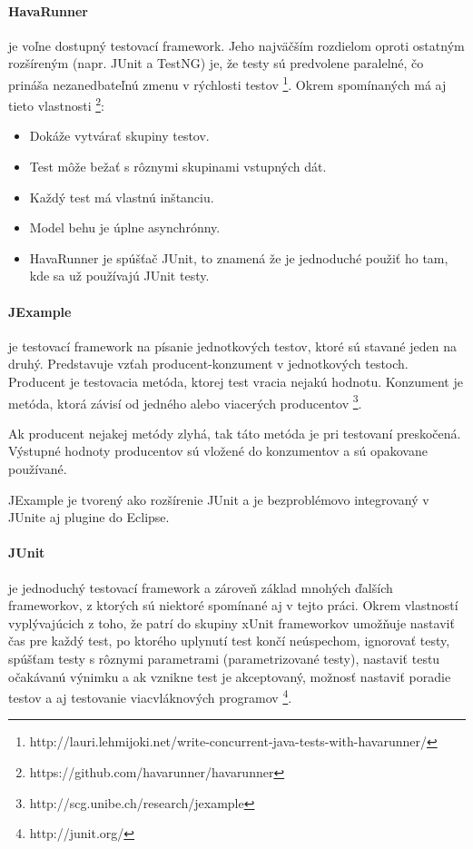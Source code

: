 \documentclass[11pt,twoside,slovak,a4paper]{article}
\begin{document}
		\paragraph{HavaRunner} je voľne dostupný testovací framework. Jeho najväčším rozdielom oproti ostatným rozšíreným (napr. JUnit a TestNG) je, že testy sú predvolene paralelné, čo prináša nezanedbateľnú zmenu v rýchlosti testov \footnote{http://lauri.lehmijoki.net/write-concurrent-java-tests-with-havarunner/}.
		Okrem spomínaných má aj tieto vlastnosti \footnote{https://github.com/havarunner/havarunner}:
		\begin{itemize}
			\item Dokáže vytvárať skupiny testov.
			\item Test môže bežať s rôznymi skupinami vstupných dát.
			\item Každý test má vlastnú inštanciu.
			\item Model behu je úplne asynchrónny.
			\item HavaRunner je spúšťač JUnit, to znamená že je jednoduché použiť ho tam, kde sa už používajú JUnit testy.
		\end{itemize}
		
		\paragraph{JExample} je testovací framework na písanie jednotkových testov, ktoré sú stavané jeden na druhý. Predstavuje vzťah producent-konzument v jednotkových testoch. Producent je testovacia metóda, ktorej test vracia nejakú hodnotu. Konzument je metóda, ktorá závisí od jedného alebo viacerých producentov \footnote{http://scg.unibe.ch/research/jexample}.
		
		Ak producent nejakej metódy zlyhá, tak táto metóda je pri testovaní preskočená. Výstupné hodnoty producentov sú vložené do konzumentov a sú opakovane používané.
		
		JExample je tvorený ako rozšírenie JUnit a je bezproblémovo integrovaný v JUnite aj plugine do Eclipse.
		
		\paragraph{JUnit} je jednoduchý testovací framework a zároveň základ mnohých ďalších frameworkov, z ktorých sú niektoré spomínané aj v tejto práci. Okrem vlastností vyplývajúcich z toho, že patrí do skupiny xUnit frameworkov umožňuje nastaviť čas pre každý test, po ktorého uplynutí test končí neúspechom, ignorovať testy, spúšťam testy s rôznymi parametrami (parametrizované testy), nastaviť testu očakávanú výnimku a ak vznikne test je akceptovaný, možnosť nastaviť poradie testov a aj testovanie viacvláknových programov \footnote{http://junit.org/}. 
		
\end{document}
